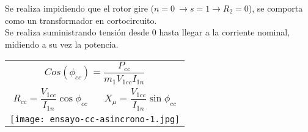 \documentclass[11pt,a4paper]{article}
\begin{document}
\begin{multicols}{2}
		\begin{cajita}
		
		\begin{flushleft}
			Se realiza impidiendo que el rotor gire ($n=0~\rightarrow s=1 \rightarrow R_2=0$), se comporta como un transformador en cortocircuito.\\
			Se realiza suministrando tensión desde 0 hasta llegar a la corriente nominal, midiendo a su vez la potencia.
		\end{flushleft}
		\begin{tabular}{c c}
			\multicolumn{2}{c}{$Cos(\phi_{cc})=\dfrac{P_{cc}}{m_1 V_{1cc} I_{1n}}$} \\ [0.3 cm ]
			$ R_{cc}=\dfrac{V_{1cc}}{I_{1n}} \cos \phi_{cc} $ &$X_{\mu}=\dfrac{V_{1cc}}{I_{1n}}\sin \phi_{cc} $\\
			\multicolumn{2}{c}{\texttt{[image: ensayo-cc-asincrono-1.jpg]}}\\
		\end{tabular}
		\end{cajita}
	\end{multicols}
\end{document}
